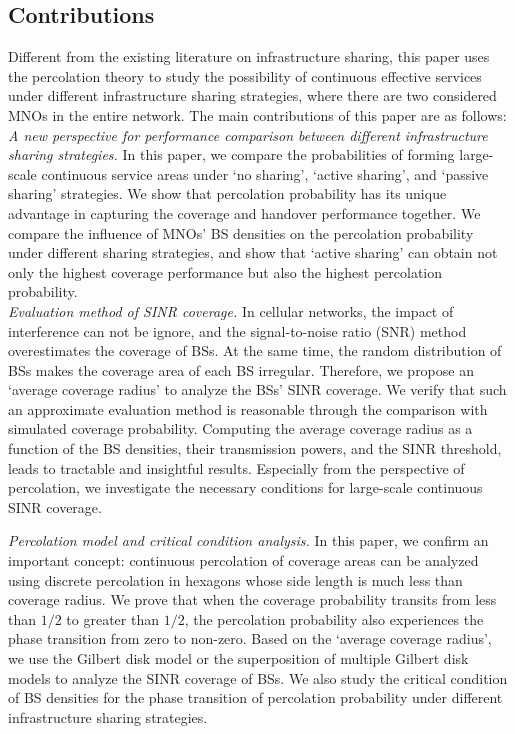 \documentclass[final]{IEEEtran}
\begin{document}
\subsection{Contributions}

Different from the existing literature on infrastructure sharing, this paper uses the percolation theory to study the possibility of continuous effective services under different infrastructure sharing strategies, where there are two considered MNOs in the entire network. The main contributions of this paper are as follows:\\
\indent \textit{A new perspective for performance comparison between different infrastructure sharing strategies.} In this paper, we compare the probabilities of forming large-scale continuous service areas under `no sharing', `active sharing', and `passive sharing' strategies. We show that percolation probability has its unique advantage in capturing the coverage and handover performance together. We compare the influence of MNOs' BS densities on the percolation probability under different sharing strategies, and show that `active sharing' can obtain not only the highest coverage performance but also the highest percolation probability. \\
\indent \textit{Evaluation method of SINR coverage.} In cellular networks, the impact of interference can not be ignore, and the signal-to-noise ratio (SNR) method overestimates the coverage of BSs. At the same time, the random distribution of BSs makes the coverage area of each BS irregular. Therefore, we propose an `average coverage radius' to analyze the BSs' SINR coverage. We verify that such an approximate evaluation method is reasonable through the comparison with simulated coverage probability. Computing the average coverage radius as a function of the BS densities, their transmission powers, and the SINR threshold, leads to tractable and insightful results. Especially from the perspective of percolation, we investigate the necessary conditions for large-scale continuous SINR coverage. 

\indent \textit{Percolation model and critical condition analysis.} In this paper, we confirm an important concept: continuous percolation of coverage areas can be analyzed using discrete percolation in hexagons whose side length is much less than coverage radius. We prove that when the coverage probability transits from less than $1/2$ to greater than $1/2$, the percolation probability also experiences the phase transition from zero to non-zero. Based on the `average coverage radius', we use the Gilbert disk model or the superposition of multiple Gilbert disk models to analyze the SINR coverage of BSs. We also study the critical condition of BS densities for the phase transition of percolation probability under different infrastructure sharing strategies. 
\end{document}
